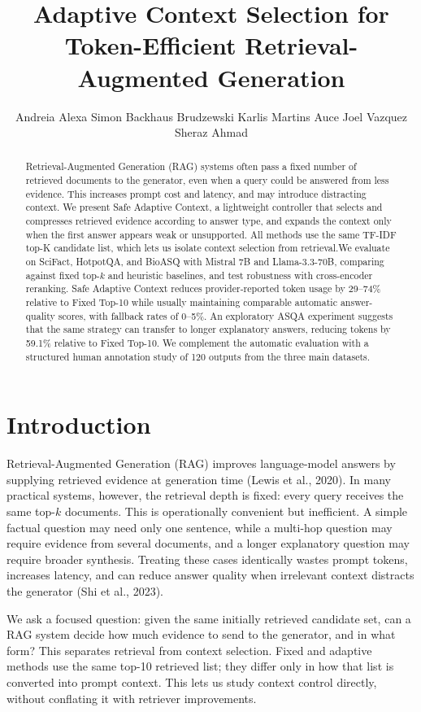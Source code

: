 \documentclass[11pt]{article}
\title{Adaptive Context Selection for Token-Efficient Retrieval-Augmented Generation}
\author{Andreia Alexa \And Simon Backhaus Brudzewski \And Karlis Martins Auce \AND Joel Vazquez \And Sheraz Ahmad}
\begin{document}
\maketitle
\begin{abstract}
Retrieval-Augmented Generation (RAG) systems often pass a fixed number of retrieved documents to the generator, even when a query could be answered from less evidence. This increases prompt cost and latency, and may introduce distracting context. We present Safe Adaptive Context, a lightweight controller that selects and compresses retrieved evidence according to answer type, and expands the context only when the first answer appears weak or unsupported. All methods use the same TF-IDF top-K candidate list, which lets us isolate context selection from retrieval.We evaluate on SciFact, HotpotQA, and BioASQ with Mistral 7B and Llama-3.3-70B, comparing against fixed top-$k$ and heuristic baselines, and test robustness with cross-encoder reranking. 
Safe Adaptive Context reduces provider-reported token usage by 29--74\% relative to Fixed Top-10 while usually maintaining comparable automatic answer-quality scores, with fallback rates of 0--5\%. An exploratory ASQA experiment suggests that the same strategy can transfer to longer explanatory answers, reducing tokens by 59.1\% relative to Fixed Top-10. We complement the automatic evaluation with a structured human annotation study of 120 outputs from the three main datasets.
\end{abstract}

\section{Introduction}

Retrieval-Augmented Generation (RAG) improves language-model answers by supplying retrieved evidence at generation time (Lewis et al., 2020). In many practical systems, however, the retrieval depth is fixed: every query receives the same top-$k$ documents. This is operationally convenient but inefficient. A simple factual question may need only one sentence, while a multi-hop question may require evidence from several documents, and a longer explanatory question may require broader synthesis. Treating these cases identically wastes prompt tokens, increases latency, and can reduce answer quality when irrelevant context distracts the generator (Shi et al., 2023).

We ask a focused question: given the same initially retrieved candidate set, can a RAG system decide how much evidence to send to the generator, and in what form? This separates retrieval from context selection. Fixed and adaptive methods use the same top-10 retrieved list; they differ only in how that list is converted into prompt context. This lets us study context control directly, without conflating it with retriever improvements.
\end{document}
